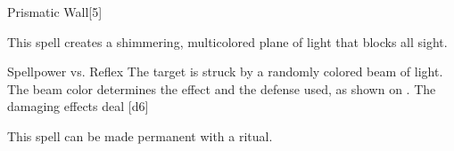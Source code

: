 \begin{spellsection}{Prismatic Wall}[5]
    \begin{spellheader}
    \end{spellheader}
    \begin{spellcontent}
        \begin{spelltargetinginfo}
        \end{spelltargetinginfo}
        \begin{spelleffects}
            \spelleffect This spell creates a shimmering, multicolored plane of light that blocks all sight.
            \spelldur \durshort \dismissable
        \end{spelleffects}
    \end{spellcontent}
    \begin{spellsubcontent}
        \begin{spelltargetinginfo}
        \end{spelltargetinginfo}
        \begin{spelleffects}
            \begin{spellattack}{Spellpower vs. Reflex}
                \spellspecial The target is struck by a randomly colored beam of light. The beam color determines the effect and the defense used, as shown on . The damaging effects deal [d6]
            \end{spellattack}
        \end{spelleffects}
    \end{spellsubcontent}
    \begin{spellfooter}
        \spellnotes This spell can be made permanent with a  ritual.
        \miscastexplode
    \end{spellfooter}
\end{spellsection}

